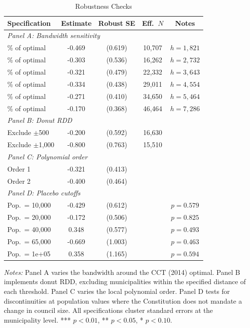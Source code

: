 \begin{table}[htbp]
\centering
\caption{Robustness Checks}
\label{tab:robustness}
\begin{tabular}{lcccc}
\toprule
Specification & Estimate & Robust SE & Eff.\ $N$ & Notes \\
\midrule
\multicolumn{5}{l}{\textit{Panel A: Bandwidth sensitivity}} \\
\quad 50\% of optimal & -0.469 & (0.619) & 10,707 & $h = 1,821$ \\
\quad 75\% of optimal & -0.303 & (0.536) & 16,262 & $h = 2,732$ \\
\quad 100\% of optimal & -0.321 & (0.479) & 22,332 & $h = 3,643$ \\
\quad 125\% of optimal & -0.334 & (0.438) & 29,011 & $h = 4,554$ \\
\quad 150\% of optimal & -0.271 & (0.410) & 34,650 & $h = 5,464$ \\
\quad 200\% of optimal & -0.170 & (0.368) & 46,464 & $h = 7,286$ \\
\midrule
\multicolumn{5}{l}{\textit{Panel B: Donut RDD}} \\
\quad Exclude $\pm$500 & -0.200 & (0.592) & 16,630 & \\
\quad Exclude $\pm$1,000 & -0.800 & (0.763) & 15,510 & \\
\midrule
\multicolumn{5}{l}{\textit{Panel C: Polynomial order}} \\
\quad Order 1 & -0.321 & (0.413) & & \\
\quad Order 2 & -0.400 & (0.464) & & \\
\midrule
\multicolumn{5}{l}{\textit{Panel D: Placebo cutoffs}} \\
\quad Pop.~= 10,000 & -0.429 & (0.612) & & $p = 0.579$ \\
\quad Pop.~= 20,000 & -0.172 & (0.506) & & $p = 0.825$ \\
\quad Pop.~= 40,000 & 0.348 & (0.577) & & $p = 0.493$ \\
\quad Pop.~= 65,000 & -0.669 & (1.003) & & $p = 0.463$ \\
\quad Pop.~= 1e+05 & 0.358 & (1.165) & & $p = 0.594$ \\
\bottomrule
\end{tabular}
\begin{tablenotes}[flushleft]\small
\item \textit{Notes:} Panel A varies the bandwidth around the CCT (2014) optimal. Panel B implements donut RDD, excluding municipalities within the specified distance of each threshold. Panel C varies the local polynomial order. Panel D tests for discontinuities at population values where the Constitution does not mandate a change in council size. All specifications cluster standard errors at the municipality level. *** $p<0.01$, ** $p<0.05$, * $p<0.10$.
\end{tablenotes}
\end{table}

